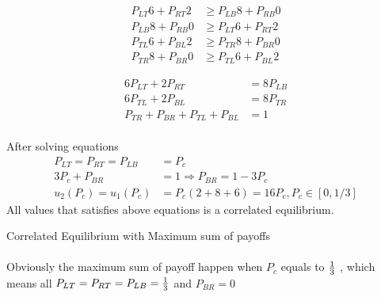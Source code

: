\documentclass[
  course = {{IE579 Game Theory and Multi-Agent Reinforcement Learning}},
  quartile = {{4}},
  assignment = 2,
  name = {{Mohammad Mahdi Rahimi}},
  studentnumber = {{20208244}},
  email = {{mahi@kaist.ac.kr}},
  firstexercise = 1
]{aga-homework}
\begin{document}
\begin{equation}
    \begin{split}
    P_{LT}6 + P_{RT}2 & \ge P_{LB}8 + P_{RB}0 \\
    P_{LB}8 + P_{RB}0 & \ge P_{LT}6 + P_{RT}2\\
    P_{TL}6 + P_{BL}2 & \ge P_{TR}8 + P_{BR}0 \\
    P_{TR}8 + P_{BR}0 & \ge P_{TL}6 + P_{BL}2
    \end{split}
\end{equation}

\begin{equation}
    \begin{split}
    6P_{LT} + 2P_{RT} & = 8P_{LB} \\
    6P_{TL} + 2P_{BL} & = 8P_{TR} \\
    P_{TR} + P_{BR} + P_{TL} + P_{BL} & = 1
    \end{split}
\end{equation}
\\
After solving equations
\\
\begin{equation}
    \begin{split}
    P_{LT} = P_{RT} = P_{LB} &= P_c\\
    3P_c + P_{BR}& = 1 \Rightarrow P_{BR} = 1 - 3P_c\\
    u_2(P_c) = u_1(P_c) &= P_c(2 + 8 + 6) = 16P_c, P_c \in [0, 1/3]
    \end{split}
\end{equation}
All values that satisfies above equations is a correlated equilibrium.

\subexercise Correlated Equilibrium with Maximum sum of payoffs
\\
\\
Obviously the maximum sum of payoff happen when $P_c$ equals to ${1 \over 3}$ , which means all $P_{LT} = P_{RT} = P_{LB} = {1 \over 3}$ and  $P_{BR} = 0$
\end{document}
